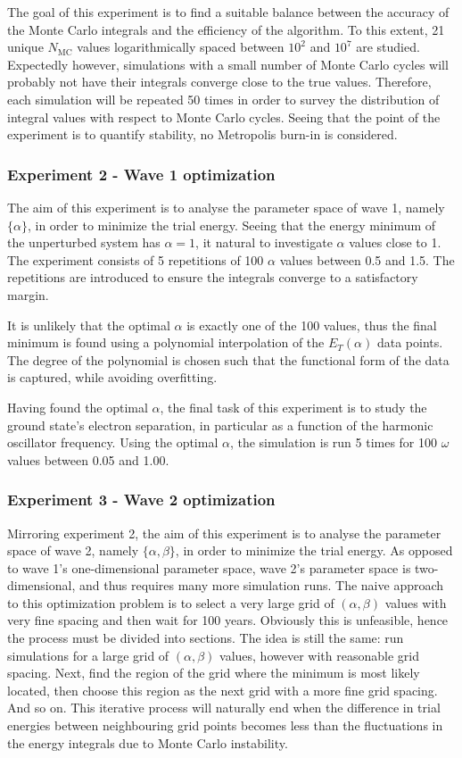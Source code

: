 \documentclass[nofootinbib,reprint,english]{revtex4-1}
\begin{document}
The goal of this experiment is to find a suitable balance between the accuracy of the Monte Carlo integrals and the efficiency of the algorithm. To this extent, 21 unique \(N_\text{MC}\) values logarithmically spaced between \(10^2\) and \(10^7\) are studied. Expectedly however, simulations with a small number of Monte Carlo cycles will probably not have their integrals converge close to the true values. Therefore, each simulation will be repeated 50 times in order to survey the distribution of integral values with respect to Monte Carlo cycles. Seeing that the point of the experiment is to quantify stability, no Metropolis burn-in is considered.
\subsubsection{Experiment 2 - Wave 1 optimization}
The aim of this experiment is to analyse the parameter space of wave 1, namely \(\{\alpha\}\), in order to minimize the trial energy. Seeing that the energy minimum of the unperturbed system has \(\alpha=1\), it natural to investigate \(\alpha\) values close to 1. The experiment consists of 5 repetitions of 100 \(\alpha\) values between 0.5 and 1.5. The repetitions are introduced to ensure the integrals converge to a satisfactory margin.

It is unlikely that the optimal \(\alpha\) is exactly one of the 100 values, thus the final minimum is found using a polynomial interpolation of the \(E_T(\alpha)\) data points. The degree of the polynomial is chosen such that the functional form of the data is captured, while avoiding overfitting.

Having found the optimal \(\alpha\), the final task of this experiment is to study the ground state's electron separation, in particular as a function of the harmonic oscillator frequency. Using the optimal \(\alpha\), the simulation is run 5 times for 100 \(\omega\) values between 0.05 and 1.00.
\subsubsection{Experiment 3 - Wave 2 optimization}
Mirroring experiment 2, the aim of this experiment is to analyse the parameter space of wave 2, namely \(\{\alpha,\beta\}\), in order to minimize the trial energy. As opposed to wave 1's one-dimensional parameter space, wave 2's parameter space is two-dimensional, and thus requires many more simulation runs. The naive approach to this optimization problem is to select a very large grid of \((\alpha,\beta)\) values with very fine spacing and then wait for 100 years. Obviously this is unfeasible, hence the process must be divided into sections. The idea is still the same: run simulations for a large grid of \((\alpha,\beta)\) values, however with reasonable grid spacing. Next, find the region of the grid where the minimum is most likely located, then choose this region as the next grid with a more fine grid spacing. And so on. This iterative process will naturally end when the difference in trial energies between neighbouring grid points becomes less than the fluctuations in the energy integrals due to Monte Carlo instability.
\end{document}
